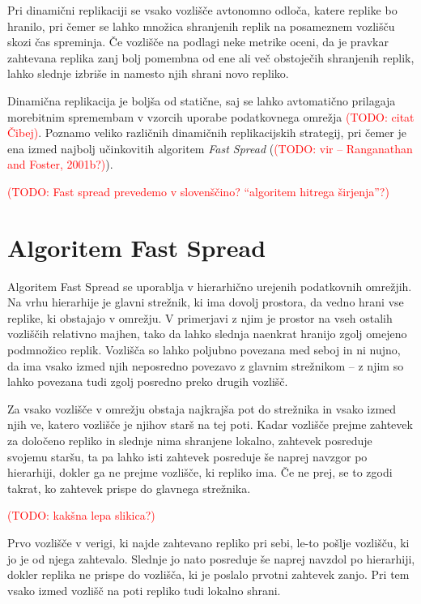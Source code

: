 \documentclass[a4paper, 12pt]{book}
\newcommand{\newterm}{\textit}
\newcommand{\TODO}[1]{\textcolor{red}{(TODO: #1)}}
\begin{document}
Pri dinamični replikaciji se vsako vozlišče avtonomno odloča, katere
replike bo hranilo, pri čemer se lahko množica shranjenih replik na
posameznem vozlišču skozi čas spreminja. Če vozlišče na podlagi neke
metrike oceni, da je pravkar zahtevana replika zanj bolj pomembna od ene
ali več obstoječih shranjenih replik, lahko slednje izbriše in namesto
njih shrani novo repliko.

Dinamična replikacija je boljša od statične, saj se lahko avtomatično
prilagaja morebitnim spremembam v vzorcih uporabe podatkovnega omrežja
\TODO{citat Čibej}. Poznamo veliko različnih dinamičnih replikacijskih
strategij, pri čemer je ena izmed najbolj učinkovitih algoritem
\newterm{Fast Spread} (\TODO{vir -- Ranganathan and Foster, 2001b?}).

\TODO{Fast spread prevedemo v slovenščino? ``algoritem hitrega širjenja''?}


\section{Algoritem Fast Spread}

Algoritem Fast Spread se uporablja v hierarhično urejenih podatkovnih omrežjih.
Na vrhu hierarhije je glavni strežnik, ki ima dovolj prostora, da vedno hrani
vse replike, ki obstajajo v omrežju. V primerjavi z njim je prostor na vseh
ostalih vozliščih relativno majhen, tako da lahko slednja naenkrat hranijo
zgolj omejeno podmnožico replik. Vozlišča so lahko poljubno povezana med seboj
in ni nujno, da ima vsako izmed njih neposredno povezavo z glavnim strežnikom
-- z njim so lahko povezana tudi zgolj posredno preko drugih vozlišč.

Za vsako vozlišče v omrežju obstaja najkrajša pot do strežnika in vsako izmed
njih ve, katero vozlišče je njihov starš na tej poti. Kadar vozlišče prejme
zahtevek za določeno repliko in slednje nima shranjene lokalno, zahtevek
posreduje svojemu staršu, ta pa lahko isti zahtevek posreduje še naprej
navzgor po hierarhiji, dokler ga ne prejme vozlišče, ki repliko ima. Če ne
prej, se to zgodi takrat, ko zahtevek prispe do glavnega strežnika.

\TODO{kakšna lepa slikica?}

Prvo vozlišče v verigi, ki najde zahtevano repliko pri sebi, le-to pošlje
vozlišču, ki jo je od njega zahtevalo. Slednje jo nato posreduje še naprej
navzdol po hierarhiji, dokler replika ne prispe do vozlišča, ki je poslalo
prvotni zahtevek zanjo. Pri tem vsako izmed vozlišč na poti repliko tudi
lokalno shrani.
\end{document}
